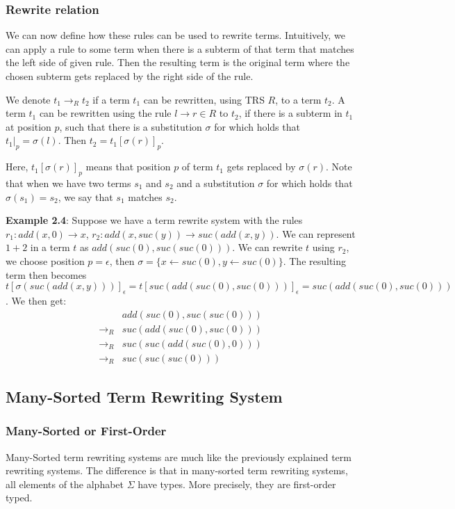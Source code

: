 \subsubsection*{Rewrite relation}
We can now define how these rules can be used to rewrite terms. Intuitively, we can apply a rule to some term when there is a subterm of that term that matches the left side of given rule. Then the resulting term is the original term where the chosen subterm gets replaced by the right side of the rule.
\begin{definition}
We denote $t_1 \rightarrow_R t_2$ if a term $t_1$ can be rewritten, using TRS $R$, to a term $t_2$. A term $t_1$ can be rewritten using the rule $l \rightarrow r \in R$ to $t_2$, if there is a subterm in $t_1$ at position $p$, such that there is a substitution $\sigma$ for which holds that $\left.t_1\right|_p = \sigma(l)$. Then $t_2 = t_1\left[ \sigma(r) \right]_p$. 

Here, $t_1\left[ \sigma(r) \right]_p$ means that position $p$ of term $t_1$ gets replaced by $\sigma(r)$. Note that when we have two terms $s_1$ and $s_2$ and a substitution $\sigma$ for which holds that $\sigma(s_1) = s_2$, we say that $s_1$ matches $s_2$.
\end{definition}
\textbf{Example 2.4}: Suppose we have a term rewrite system with the rules $r_1: add(x, 0) \rightarrow x$, $r_2: add(x, suc(y)) \rightarrow suc(add(x, y))$. We can represent $1 + 2$ in a term $t$ as $add(suc(0), suc(suc(0)))$. We can rewrite $t$ using $r_2$, we choose position $p = \epsilon$, then $\sigma = \{ x \leftarrow suc(0), y \leftarrow suc(0) \}$. The resulting term then becomes $t\left[ \sigma(suc(add(x, y))) \right]_\epsilon = t\left[ suc(add(suc(0), suc(0))) \right]_\epsilon = suc(add(suc(0), suc(0)))$. We then get:
$$
\begin{array}{rl}
                  & add(suc(0), suc(suc(0))) \\
    \rightarrow_R & suc(add(suc(0), suc(0))) \\
    \rightarrow_R & suc(suc(add(suc(0), 0))) \\
    \rightarrow_R & suc(suc(suc(0)))
\end{array}
$$

\subsection{Many-Sorted Term Rewriting System}
\subsubsection{Many-Sorted or First-Order}
Many-Sorted term rewriting systems are much like the previously explained term rewriting systems. The difference is that in many-sorted term rewriting systems, all elements of the alphabet $\Sigma$ have types. More precisely, they are first-order typed. 

